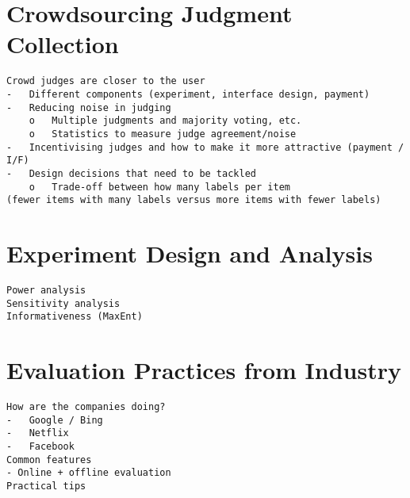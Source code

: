 \documentclass[openany]{now} %
\begin{document}
\chapter{Crowdsourcing Judgment Collection}

\begin{verbatim}
Crowd judges are closer to the user
-	Different components (experiment, interface design, payment)
-	Reducing noise in judging
	o	Multiple judgments and majority voting, etc.
	o	Statistics to measure judge agreement/noise
-	Incentivising judges and how to make it more attractive (payment / I/F)
-	Design decisions that need to be tackled
	o	Trade-off between how many labels per item 
(fewer items with many labels versus more items with fewer labels)
\end{verbatim}

\cite{Megorskaya2015} \cite{Davtyan2015}

\chapter{Experiment Design and Analysis}

\begin{verbatim}
Power analysis
Sensitivity analysis
Informativeness (MaxEnt)
\end{verbatim}


\chapter{Evaluation Practices from Industry}

\begin{verbatim}
How are the companies doing?
-	Google / Bing
-	Netflix
-	Facebook
Common features
- Online + offline evaluation
Practical tips
\end{verbatim}

\cite{Gomez-Uribe2015}

\backmatter  %



\end{document}
